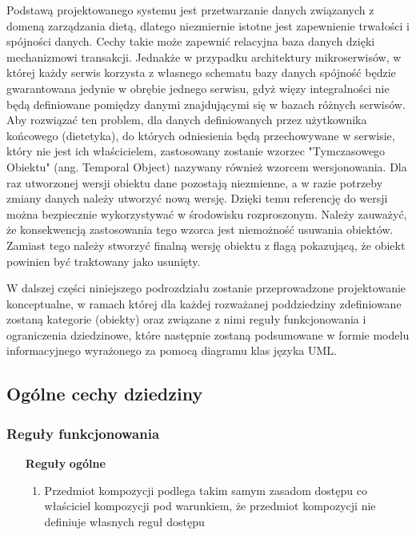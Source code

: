 Podstawą projektowanego systemu jest przetwarzanie danych związanych z domeną zarządzania dietą, dlatego niezmiernie istotne jest zapewnienie trwałości i spójności danych.
Cechy takie może zapewnić relacyjna baza danych dzięki mechanizmowi transakcji\cite{book:bazury}.
Jednakże w przypadku architektury mikroserwisów, w której każdy serwis korzysta z własnego schematu bazy danych spójność będzie gwarantowana jedynie w obrębie jednego serwisu,
gdyż więzy integralności nie będą definiowane pomiędzy danymi znajdującymi się w bazach różnych serwisów.
Aby rozwiązać ten problem, dla danych definiowanych przez użytkownika końcowego (dietetyka), do których odniesienia będą przechowywane w serwisie, który nie jest ich właścicielem,
zastosowany zostanie wzorzec "Tymczasowego Obiektu" (ang. Temporal Object)\cite{url:temporal-object-pattern} nazywany również wzorcem wersjonowania.
Dla raz utworzonej wersji obiektu dane pozostają niezmienne, a w razie potrzeby zmiany danych należy utworzyć nową wersję.
Dzięki temu referencję do wersji można bezpiecznie wykorzystywać w środowisku rozproszonym.
Należy zauważyć, że konsekwencją zastosowania tego wzorca jest niemożność usuwania obiektów.
Zamiast tego należy stworzyć finalną wersję obiektu z flagą pokazującą, że obiekt powinien być traktowany jako usunięty.

\par
W dalszej części niniejszego podrozdziału zostanie przeprowadzone projektowanie konceptualne,
w ramach której dla każdej rozważanej poddziedziny zdefiniowane zostaną kategorie (obiekty) oraz związane z nimi reguły funkcjonowania i ograniczenia dziedzinowe\cite{book:bazury},
które następnie zostaną podsumowane w formie modelu informacyjnego wyrażonego za pomocą diagramu klas języka UML.

\subsection{Ogólne cechy dziedziny}\label{ssubsubsec:database:domain}
\subsubsection{Reguły funkcjonowania}\label{subsubsec:database:domain:functionalRules}
\begin{itemize}[label={\textbf{Reguły dla}}, wide, labelwidth=!, labelindent=0pt]
    \setlength\itemsep{1.75em}
    \item[\textbf{Reguły}] \textbf{ogólne}
    \begin{enumerate}[label={\textbf{REG/0/\protect\twodigits{\arabic{enumi}}}}, wide, labelwidth=!, align=left, leftmargin=3cm]
        \item Przedmiot kompozycji podlega takim samym zasadom dostępu co właściciel kompozycji pod warunkiem, że przedmiot kompozycji nie definiuje własnych reguł dostępu
    \end{enumerate}
\end{itemize}

